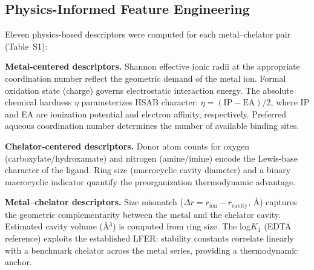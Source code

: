\documentclass[journal=jacsat,manuscript=article]{achemso}
\begin{document}
\subsection{Physics-Informed Feature Engineering}

Eleven physics-based descriptors were computed for each metal--chelator pair (Table~S1):

\textbf{Metal-centered descriptors.}
Shannon effective ionic radii at the appropriate coordination number\cite{Shannon1976}
reflect the geometric demand of the metal ion.
Formal oxidation state (charge) governs electrostatic interaction energy.
The absolute chemical hardness $\eta$\cite{Parr1983} parameterizes HSAB character:
$\eta = (\text{IP} - \text{EA})/2$, where IP and EA are ionization potential and
electron affinity, respectively.\cite{Pearson1963,Parr1983,Hancock1989}
Preferred aqueous coordination number determines the number of available binding sites.

\textbf{Chelator-centered descriptors.}
Donor atom counts for oxygen (carboxylate/hydroxamate) and nitrogen (amine/imine)
encode the Lewis-base character of the ligand.
Ring size (macrocyclic cavity diameter) and a binary macrocyclic indicator quantify
the preorganization thermodynamic advantage.\cite{RocaSabio2009,Baranyai2007}

\textbf{Metal--chelator descriptors.}
Size mismatch ($\Delta r = r_\mathrm{ion} - r_\mathrm{cavity}$, \AA) captures the
geometric complementarity between the metal and the chelator cavity.
Estimated cavity volume (\AA$^3$) is computed from ring size.
The log$K_1$ (EDTA reference) exploits the established LFER: stability constants
correlate linearly with a benchmark chelator across the metal
series,\cite{Hancock1989,MartellSmith2004} providing a thermodynamic anchor.
\end{document}
